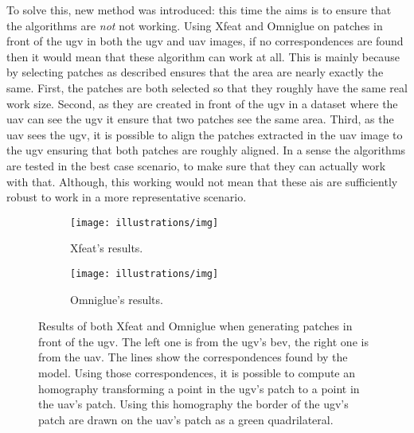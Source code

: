 
To solve this, new method was introduced: this time the aims is to ensure that the algorithms are \textit{not} not working.
Using Xfeat and Omniglue on patches in front of the \gls{ugv} in both the \gls{ugv} and \gls{uav} images, if no correspondences
are found then it would mean that these algorithm can work at all.
This is mainly because by selecting patches as described ensures that the area are nearly exactly the same.
First, the patches are both selected so that they roughly have the same real work size.
Second, as they are created in front of the \gls{ugv} in a dataset where the \gls{uav} can see the \gls{ugv} it ensure
that two patches see the same area.
Third, as the \gls{uav} sees the \gls{ugv}, it is possible to align the patches extracted in the \gls{uav} image to the
\gls{ugv} ensuring that both patches are roughly aligned.
In a sense the algorithms are tested in the best case scenario, to make sure that they can actually work with that.
Although, this working would not mean that these \gls{ai}s are sufficiently robust to work in a more representative scenario.

\begin{figure}[ht!]
    \centering
    \begin{subfigure}[t]{0.32\textwidth}
        \centering
        \texttt{[image: illustrations/img]}
        \caption{Xfeat's results.} %
        \label{fig:find_corr:along_traj:xfeat}
    \end{subfigure}
    \begin{subfigure}[t]{0.32\textwidth}
        \centering
        \texttt{[image: illustrations/img]}
        \caption{Omniglue's results.}
        \label{fig:find_corr:along_traj:omniglue}
    \end{subfigure}
    \caption{Results of both Xfeat and Omniglue when generating patches in front of the \gls{ugv}.
    The left one is from the \gls{ugv}'s bev, the right one is from the \gls{uav}.
    The lines show the correspondences found by the model.
    Using those correspondences, it is possible to compute an homography transforming a point in the \gls{ugv}'s patch
    to a point in the \gls{uav}'s patch.
    Using this homography the border of the \gls{ugv}'s patch are drawn on the \gls{uav}'s patch as a green quadrilateral.}
    \label{fig:find_corr:along_traj:results}
\end{figure}

